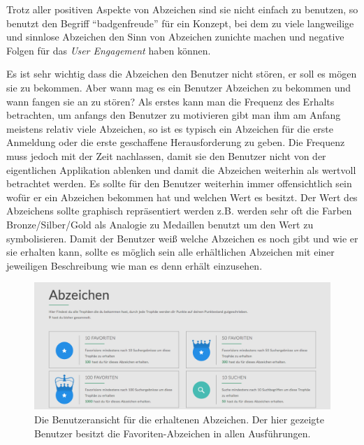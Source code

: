 \documentclass[12pt,twoside]{book}
\begin{document}
Trotz aller positiven Aspekte von Abzeichen sind sie nicht einfach zu benutzen, so benutzt \citep{zichermann2011gamification, 56} den Begriff ``badgenfreude'' für ein Konzept, bei dem zu viele langweilige und sinnlose Abzeichen den Sinn von Abzeichen zunichte machen und negative Folgen für das \textit{User Engagement} haben können.

Es ist sehr wichtig dass die Abzeichen den Benutzer nicht stören, er soll es mögen sie zu bekommen. Aber wann mag es ein Benutzer Abzeichen zu bekommen und wann fangen sie an zu stören?
Als erstes kann man die Frequenz des Erhalts betrachten, um anfangs den Benutzer zu motivieren gibt man ihm am Anfang meistens relativ viele Abzeichen, so ist es typisch ein Abzeichen für die erste Anmeldung oder die erste geschaffene Herausforderung zu geben.
Die Frequenz muss jedoch mit der Zeit nachlassen, damit sie den Benutzer nicht von der eigentlichen Applikation ablenken und damit die Abzeichen weiterhin als wertvoll betrachtet werden.
Es sollte für den Benutzer weiterhin immer offensichtlich sein wofür er ein Abzeichen bekommen hat und welchen Wert es besitzt. Der Wert des Abzeichens sollte graphisch repräsentiert werden z.B. werden sehr oft die Farben Bronze/Silber/Gold als Analogie zu Medaillen benutzt um den Wert zu symbolisieren.
Damit der Benutzer weiß welche Abzeichen es noch gibt und wie er sie erhalten kann, sollte es möglich sein alle erhältlichen Abzeichen mit einer jeweiligen Beschreibung wie man es denn erhält einzusehen.

\begin{figure}[htbp]
    \centering
    \includegraphics[width=1.0\textwidth]{images/infoboard_badges.png}
    \caption{Die Benutzeransicht für die erhaltenen Abzeichen. Der hier gezeigte Benutzer besitzt die Favoriten-Abzeichen in allen Ausführungen.}
    \label{fig:badges}
\end{figure}
\end{document}
